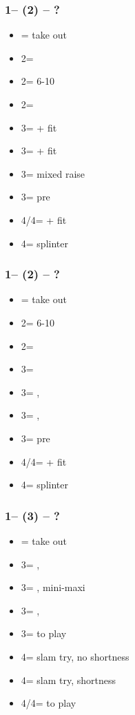 \documentclass[12pt, a4paper]{article}
\begin{document}
\subsubsection*{1\spades -- (2\diams) -- ?}
\begin{itemize}
    \item \dbl = take out
    \item 2\hearts = \fonce
    \item 2\spades = 6-10
    \item 2\nt = \clubs \invp
    \item 3\clubs = \gf + fit
    \item 3\diams = \inv + fit
    \item 3\hearts = mixed raise
    \item 3\spades = pre
    \item 4\clubs/4\hearts = \nat + fit
    \item 4\diams = splinter
\end{itemize}

\subsubsection*{1\spades -- (2\hearts) -- ?}
\begin{itemize}
    \item \dbl = take out
    \item 2\spades = 6-10
    \item 2\nt = \clubs \invp
    \item 3\clubs = \diams \invp
    \item 3\diams = \spades, \gf
    \item 3\hearts = \spades, \inv
    \item 3\spades = pre
    \item 4\clubs/4\diams = \nat + fit
    \item 4\hearts = splinter
\end{itemize}

\subsubsection*{1\spades -- (3\clubs) -- ?}
\begin{itemize}
    \item \dbl = take out
    \item 3\diams = \hearts, \invp
    \item 3\hearts = \spades, mini-maxi
    \item 3\spades = \spades, \inv
    \item 3\nt = to play
    \item 4\clubs = slam try, no \clubs shortness
    \item 4\diams = slam try, \clubs shortness
    \item 4\hearts/4\spades = to play
\end{itemize}
\end{document}
